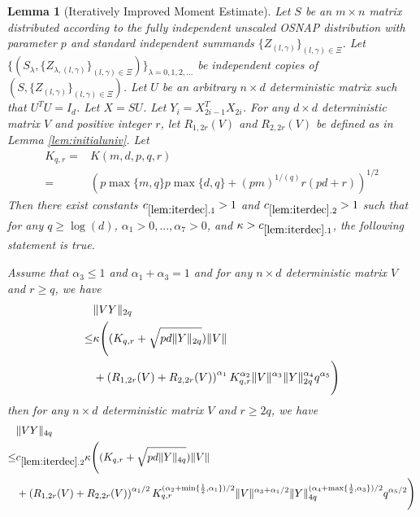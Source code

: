 \documentclass[11pt]{amsart}
\numberwithin{equation}{section}
\numberwithin{equation}{section}
\DeclarePairedDelimiter{\norm}{\lVert}{\rVert}
\newtheorem{lemma}[theorem]{Lemma}
\begin{document}
\begin{lemma}[Iteratively Improved Moment Estimate]\label{lem:iterdec}
Let $S$ be an $m \times n$ matrix distributed according to the fully independent unscaled OSNAP distribution with parameter $p$ and standard independent summands $\{Z_{(l,\gamma)}\}_{(l,\gamma) \in \Xi}$. Let $\{(S_{\lambda},\{Z_{\lambda,(l,\gamma)}\}_{(l,\gamma) \in \Xi})\}_{\lambda=0,1,2,...}$ be independent copies of $(S,\{Z_{(l,\gamma)}\}_{(l,\gamma) \in \Xi})$. Let $U$ be an arbitrary $n \times d$ deterministic matrix such that $U^TU=I_d$.
Let $X=SU$. Let $Y_i=X_{2i-1}^TX_{2i}$.
For any $d \times d$ deterministic matrix $V$ and positive integer $r$, let $R_{1,2r}(V)$ and $R_{2,2r}(V)$ be defined as in Lemma \ref{lem:initialuniv}.
Let
\begin{align*}
    K_{q,r}=&K(m,d,p,q,r)\\=&\left(p\max\{m,q\}p\max\{d,q\}+(pm)^{1/(q)}r(pd+r) \right)^{1/2}
\end{align*}
Then there exist constants $c_{\ref{lem:iterdec}.1}>1$ and $c_{\ref{lem:iterdec}.2}>1$ such that for any $q \ge \log(d)$, $\alpha_1>0,...,\alpha_7>0$, and $\kappa > c_{\ref{lem:iterdec}.1}$, the following statement is true.

Assume that
    $\alpha_3 \le 1$ and $\alpha_1+\alpha_3=1$
and for any $n \times d$ deterministic matrix $V$ and $r \ge q$, we have
\begin{equation}\label{eq:iterassum}
    \begin{aligned}
    &\norm{VY}_{2q} \\\le& \kappa \Bigg((K_{q,r}+\sqrt{pd\norm{Y}_{2q}})\norm{V} \\&+ \left(R_{1,2r}(V)+R_{2,2r}(V)\right)^{\alpha_1}K_{q,r}^{\alpha_2}\norm{V}^{\alpha_3} \norm{Y}_{2q}^{\alpha_4}q^{\alpha_5}\Bigg)
\end{aligned}
\end{equation}
then for any $n \times d$ deterministic matrix $V$ and $r \ge 2q$, we have
\begin{equation}\label{eq:iterconclu}
    \begin{aligned}
    &\norm{VY}_{4q} \\\le& c_{\ref{lem:iterdec}.2}\kappa \Bigg((K_{q,r}+\sqrt{pd\norm{Y}_{4q}})\norm{V} \\&+ \left(R_{1,2r}(V)+R_{2,2r}(V)\right)^{\alpha_1/2}K_{q,r}^{(\alpha_2+\min\{\frac{1}{2},\alpha_1\})/2}\norm{V}^{\alpha_3+\alpha_1/2} \norm{Y}_{4q}^{(\alpha_4+\max\{\frac{1}{2},\alpha_3\})/2}q^{\alpha_5/2}\Bigg)
\end{aligned}
\end{equation}



\end{lemma}
\end{document}
